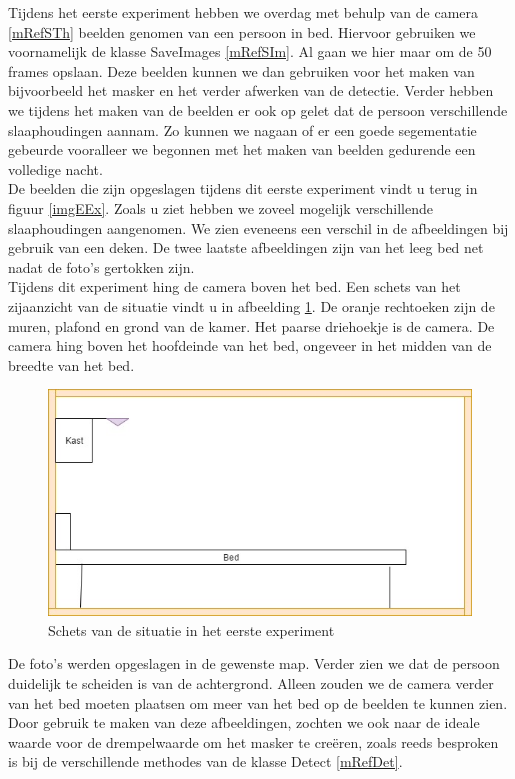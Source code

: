Tijdens het eerste experiment hebben we overdag met behulp van de camera \ref{mRefSTh} beelden genomen van een persoon in bed. Hiervoor gebruiken we voornamelijk de klasse SaveImages \ref{mRefSIm}. Al gaan we hier maar om de 50 frames opslaan. Deze beelden kunnen we dan gebruiken voor het maken van bijvoorbeeld het masker en het verder afwerken van de detectie. Verder hebben we tijdens het maken van de beelden er ook op gelet dat de persoon verschillende slaaphoudingen aannam. Zo kunnen we nagaan of er een goede segementatie gebeurde vooralleer we begonnen met het maken van beelden gedurende een volledige nacht.\\
De beelden die zijn opgeslagen tijdens dit eerste experiment vindt u terug in figuur \ref{imgEEx}. Zoals u ziet hebben we zoveel mogelijk verschillende slaaphoudingen aangenomen. We zien eveneens een verschil in de afbeeldingen bij gebruik van een deken. De twee laatste afbeeldingen zijn van het leeg bed net nadat de foto's gertokken zijn. \\
Tijdens dit experiment hing de camera boven het bed. Een schets van het zijaanzicht van de situatie vindt u in afbeelding \ref{imgEEx2}. De oranje rechtoeken zijn de muren, plafond en grond van de kamer. Het paarse driehoekje is de camera. De camera hing boven het hoofdeinde van het bed, ongeveer in het midden van de breedte van het bed. \\
\begin{figure}[h]
	\includegraphics[scale=0.5]{SchetsExperiment1}
	\caption{Schets van de situatie in het eerste experiment}
	\label{imgEEx2}
\end{figure}
De foto's werden opgeslagen in de gewenste map. Verder zien we dat de persoon duidelijk te scheiden is van de achtergrond. Alleen zouden we de camera verder van het bed moeten plaatsen om meer van het bed op de beelden te kunnen zien. Door gebruik te maken van deze afbeeldingen, zochten we ook naar de ideale waarde voor de drempelwaarde om het masker te cre\"eren, zoals reeds besproken is bij de verschillende methodes van de klasse Detect \ref{mRefDet}.


